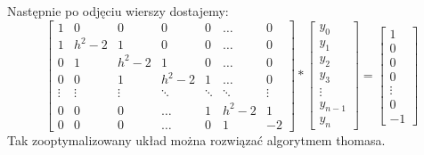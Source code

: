 \documentclass[12pt]{article}
\begin{document}
Następnie po odjęciu wierszy dostajemy: 
\[
\begin{bmatrix}
    1 & 0 & 0 & 0 & 0 & \dots & 0\\
    1 & h^{2}-2 & 1 & 0 & 0 & \dots & 0\\ 
    0 & 1 & h^{2}-2 & 1 & 0 & \dots & 0\\
    0 & 0 & 1 & h^{2}-2 & 1 &\dots & 0\\
    \vdots & \vdots & \vdots & \ddots & \ddots & \ddots & \vdots\\
    0 & 0 & 0 & \hdots & 1 & h^{2}-2 & 1\\
    0 & 0 & 0 & \hdots & 0 & 1 & -2
\end{bmatrix}
*
\begin{bmatrix}
    y_{0}\\
    y_{1}\\
    y_{2}\\
    y_{3}\\
    \vdots\\
    y_{n-1}\\
    y_{n}
\end{bmatrix}
=
\begin{bmatrix}
    1\\
    0\\
    0\\
    0\\
    \vdots\\
    0\\
    -1
\end{bmatrix}
\]
Tak zooptymalizowany układ można rozwiązać algorytmem thomasa.
\end{document}

